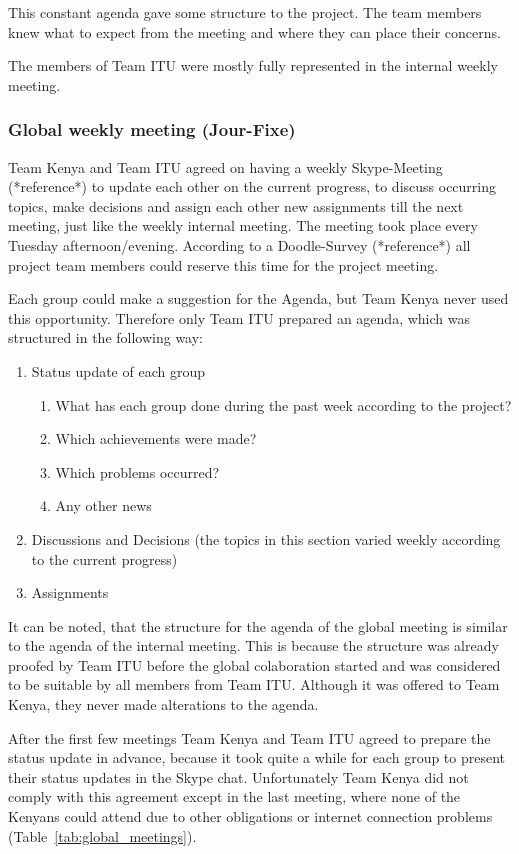 This constant agenda gave some structure to the project. The team members knew what to expect from the meeting and where they can place their concerns.

The members of Team ITU were mostly fully represented in the internal weekly meeting. 

\subsubsection {Global weekly meeting (Jour-Fixe)}
Team Kenya and Team ITU agreed on having a weekly Skype-Meeting (*reference*) to update each other on the current progress, to discuss occurring topics, make decisions and assign each other new assignments till the next meeting, just like the weekly internal meeting. The meeting took place every Tuesday afternoon/evening. According to a Doodle-Survey (*reference*) all project team members could reserve this time for the project meeting.

Each group could make a suggestion for the Agenda, but Team Kenya never used this opportunity. Therefore only Team ITU prepared an agenda, which was structured in the following way:

	\begin{enumerate}
		\item Status update of each group
			\begin{enumerate}
				\item What has each group done during the past week according to the project?
				\item Which achievements were made?	
				\item Which problems occurred?
				\item Any other news
			\end{enumerate}
		\item Discussions and Decisions (the topics in this section varied weekly according to the current progress)
		\item Assignments
	\end{enumerate}

It can be noted, that the structure for the agenda of the global meeting is similar to the agenda of the internal meeting. This is because the structure was already proofed by Team ITU before the global colaboration started and was considered to be suitable by all members from Team ITU. Although it was offered to Team Kenya, they never made alterations to the agenda.

After the first few meetings Team Kenya and Team ITU agreed to prepare the status update in advance, because it took quite a while for each group to present their status updates in the Skype chat. Unfortunately Team Kenya did not comply with this agreement except in the last meeting, where none of the Kenyans could attend due to other obligations or internet connection problems (Table~\ref{tab:global_meetings}).

